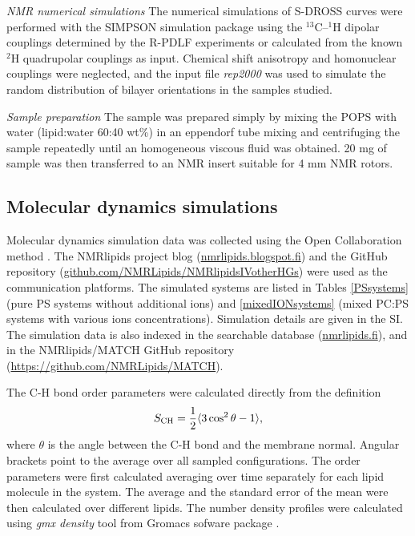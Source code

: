 \documentclass[aps,prl,superscriptaddress,twocolumn]{revtex4}
\begin{document}
\emph{NMR numerical simulations}
The numerical simulations of S-DROSS curves were performed with the SIMPSON simulation package \cite{bak00} using the $^{13}$C--$^1$H
dipolar couplings determined by the R-PDLF experiments or calculated from the known $^2$H quadrupolar couplings \cite{browning80} as input.
Chemical shift anisotropy and homonuclear couplings were neglected, and the input file {\it{rep2000}} was used to simulate the random
distribution of bilayer orientations in the samples studied.

\emph{Sample preparation}
The sample was prepared simply by mixing the POPS with water (lipid:water 60:40 wt\%) in an eppendorf
tube mixing and centrifuging the sample repeatedly until an homogeneous viscous fluid was obtained.
20 mg of sample was then transferred to an NMR insert suitable for 4 mm NMR rotors.  


\subsection{Molecular dynamics simulations}
Molecular dynamics simulation data was collected using
the Open Collaboration method \cite{botan15}.
The NMRlipids project blog (\url{nmrlipids.blogspot.fi}) and
the GitHub repository (\url{github.com/NMRLipids/NMRlipidsIVotherHGs})
were used as the communication platforms.
The simulated systems are listed in 
Tables \ref{PSsystems} (pure PS systems without additional ions) 
and \ref{mixedIONsystems} (mixed PC:PS systems with various ions concentrations).
Simulation details are given in the SI.
The simulation data is also indexed in the
searchable database (\url{nmrlipids.fi}),
and in the NMRlipids/MATCH GitHub repository (\url{https://github.com/NMRLipids/MATCH}).

The C-H bond order parameters were calculated directly
from the definition
\begin{equation}
S_{\rm CH}=\frac{1}{2}\langle 3\cos^2\theta -1 \rangle,
\end{equation}
where $\theta$ is the angle between the C-H bond and the membrane normal.
Angular brackets point to the average over all sampled configurations.
The order parameters were first calculated averaging over time separately
for each lipid molecule in the system. The average and
the standard error of the mean were then calculated over different lipids.
The number density profiles were calculated using {\it gmx density} tool
from Gromacs sofware package \cite{gromacsMANUAL}.
\end{document}
